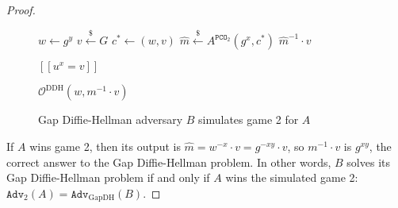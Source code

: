 \documentclass[runningheads]{llncs}
\newcommand{\pco}{\texttt{PCO}}
\newcommand{\leftsample}{\stackrel{\$}{\leftarrow}}
\newcommand{\llbrack}{[\![}
\newcommand{\rrbrack}{]\!]}
\newcommand{\adv}{\texttt{Adv}}
\begin{document}
\begin{proof}
\begin{figure}[h]
        \begin{minipage}[t]{0.45\textwidth}
            \begin{algorithm}[H]
                \caption*{$B^{\mathcal{O}^\text{DDH}}(g, g^x, g^y)$}
                \begin{algorithmic}[1]
                    \State $w \leftarrow g^y$
                    \State $v \leftsample G$
                    \State $c^\ast \leftarrow (w, v)$
                    \State $\hat{m} \leftsample A^{\pco_2}(g^x, c^\ast)$
                    \State \Return $\hat{m}^{-1}\cdot v$
                \end{algorithmic}
            \end{algorithm}
        \end{minipage}
        \begin{minipage}[t]{0.45\textwidth}
            \begin{algorithm}[H]
                \caption*{$\mathcal{O}^\text{DDH}(u, v)$}
                \begin{algorithmic}[1]
                    \State \Return $\llbrack u^x = v \rrbrack$
                \end{algorithmic}
            \end{algorithm}\vspace{-0.3cm}
            \begin{algorithm}[H]
                \caption*{$\pco_2(m, c=(w, v))$}
                \begin{algorithmic}[1]
                    \State \Return $\mathcal{O}^\text{DDH}(w, m^{-1}\cdot v)$
                \end{algorithmic}
            \end{algorithm}
        \end{minipage}

        \caption{Gap Diffie-Hellman adversary $B$ simulates game 2 for $A$}\label{fig:ow-pca-to-gap-dh}
    \end{figure}

    If $A$ wins game 2, then its output is $\hat{m} = w^{-x}\cdot v = g^{-xy}\cdot v$, so $m^{-1}\cdot v$ is $g^{xy}$, the correct answer to the Gap Diffie-Hellman problem. In other words, $B$ solves its Gap Diffie-Hellman problem if and only if $A$ wins the simulated game 2: $\adv_2(A) = \adv_\text{GapDH}(B)$.
\end{proof}
\end{document}
